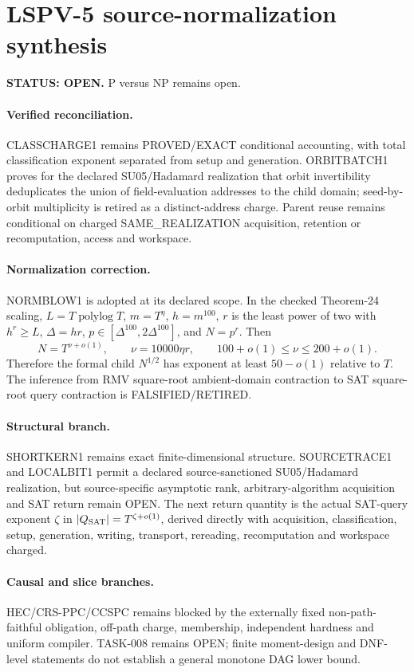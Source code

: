 \documentclass[11pt]{article}
\begin{document}
\section*{LSPV-5 source-normalization synthesis}
\textbf{STATUS: OPEN.} P versus NP remains open.

\paragraph{Verified reconciliation.} CLASSCHARGE1 remains PROVED/EXACT conditional accounting, with total classification exponent separated from setup and generation. ORBITBATCH1 proves for the declared SU05/Hadamard realization that orbit invertibility deduplicates the union of field-evaluation addresses to the child domain; seed-by-orbit multiplicity is retired as a distinct-address charge. Parent reuse remains conditional on charged SAME\_REALIZATION acquisition, retention or recomputation, access and workspace.

\paragraph{Normalization correction.} NORMBLOW1 is adopted at its declared scope. In the checked Theorem-24 scaling, $L=T\operatorname{polylog}T$, $m=T^\eta$, $h=m^{100}$, $r$ is the least power of two with $h^r\ge L$, $\Delta=hr$, $p\in[\Delta^{100},2\Delta^{100}]$, and $N=p^r$. Then
\[
N=T^{\nu+o(1)},\qquad \nu=10000\eta r,\qquad 100+o(1)\le\nu\le200+o(1).
\]
Therefore the formal child $N^{1/2}$ has exponent at least $50-o(1)$ relative to $T$. The inference from RMV square-root ambient-domain contraction to SAT square-root query contraction is FALSIFIED/RETIRED.

\paragraph{Structural branch.} SHORTKERN1 remains exact finite-dimensional structure. SOURCETRACE1 and LOCALBIT1 permit a declared source-sanctioned SU05/Hadamard realization, but source-specific asymptotic rank, arbitrary-algorithm acquisition and SAT return remain OPEN. The next return quantity is the actual SAT-query exponent $\zeta$ in $|Q_{\rm SAT}|=T^{\zeta+o(1)}$, derived directly with acquisition, classification, setup, generation, writing, transport, rereading, recomputation and workspace charged.

\paragraph{Causal and slice branches.} HEC/CRS-PPC/CCSPC remains blocked by the externally fixed non-path-faithful obligation, off-path charge, membership, independent hardness and uniform compiler. TASK-008 remains OPEN; finite moment-design and DNF-level statements do not establish a general monotone DAG lower bound.
\end{document}
